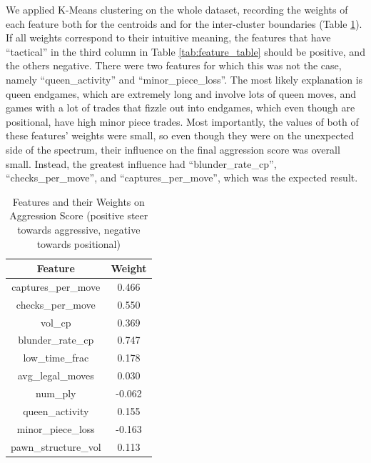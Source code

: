 We applied K-Means clustering on the whole dataset, recording the weights of each feature both for the centroids and for the inter-cluster boundaries (Table \ref{tab:weights_table}).
If all weights correspond to their intuitive meaning, the features that have ``tactical'' in the third column in Table \ref{tab:feature_table} should be positive, and the others negative.
There were two features for which this was not the case, namely ``queen\_activity'' and ``minor\_piece\_loss''.
The most likely explanation is queen endgames, which are extremely long and involve lots of queen moves, and games with a lot of trades that fizzle out into endgames, which even though are positional, have high minor piece trades.
Most importantly, the values of both of these features' weights were small, so even though they were on the unexpected side of the spectrum, their influence on the final aggression score was overall small.
Instead, the greatest influence had ``blunder\_rate\_cp'', ``checks\_per\_move'', and ``captures\_per\_move'', which was the expected result.

\begin{table}[H]
\centering
\caption{Features and their Weights on Aggression Score (positive steer towards aggressive, negative towards positional)}
\label{tab:weights_table}
\begin{tabular}{c|c}
\hline
\textbf{Feature} & \textbf{Weight} \\
\hline
captures\_per\_move & 0.466\\
checks\_per\_move & 0.550\\
vol\_cp & 0.369\\
blunder\_rate\_cp & 0.747\\
low\_time\_frac & 0.178\\
avg\_legal\_moves & 0.030\\
num\_ply & -0.062\\
queen\_activity & 0.155\\
minor\_piece\_loss & -0.163\\
pawn\_structure\_vol & 0.113\\
\hline
\end{tabular}
\end{table}

